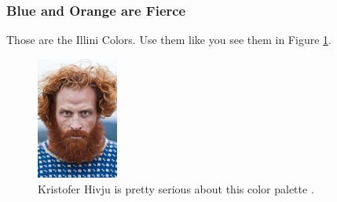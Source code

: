 \begin{frame}
  \frametitle{Blue and Orange are Fierce}
        Those are the Illini Colors. Use them like you see them in Figure 
        \ref{fig:fierce}.
  \begin{figure}[htbp!]
    \begin{center}
      \includegraphics[height=4cm]{./images/fierce}
    \end{center}
          \caption{Kristofer Hivju is pretty serious about this color palette \cite{lastname_firstword_1900}.}
    \label{fig:fierce}
  \end{figure}
\end{frame}
